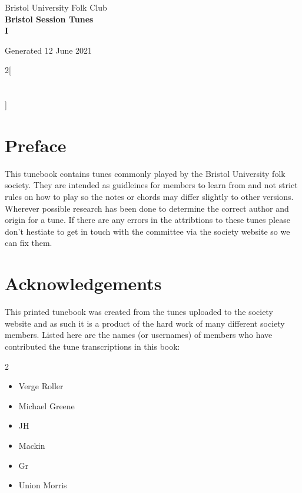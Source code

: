\documentclass[12pt,a4paper,twoside]{article}
\makeatletter
\newcommand{\thetitle}{Bristol Session Tunes \\ \vspace{0.65cm} I}
\newcommand{\thedate}{12 June 2021}
\renewcommand\tableofcontents{%
    \begin{multicols}{2}[
      \centering
      \section*{\large\contentsname
        \@mkboth{%
           \MakeUppercase\contentsname}{\MakeUppercase\contentsname}}]
    \@starttoc{toc}%
    \end{multicols}
}
\makeatother
\begin{document}
\begin{titlepage}
   \begin{center}
       \large Bristol University Folk Club \\

       \vspace{4cm}
       \textbf{\Huge \thetitle}

       \vspace{0.5cm}
       Generated \thedate

       \vspace{1.5cm}

       \vfill

   \end{center}
\end{titlepage}

\tableofcontents

\section{Preface}

This tunebook contains tunes commonly played by the Bristol University folk society. They are intended as guidleines for members to learn from and not strict rules on how to play so the notes or chords may differ slightly to other versions.
Wherever possible research has been done to determine the correct author and origin for a tune. If there are any errors in the attribtions to these tunes please don't hestiate to get in touch with the committee via the society website so we can fix them.

\section{Acknowledgements}

This printed tunebook was created from the tunes uploaded to the society website and as such it is a product of the hard work of many different society members. Listed here are the names (or usernames) of members who have contributed the tune transcriptions in this book:

\begin{multicols}{2}
\begin{itemize}\item Verge Roller
\item Michael Greene
\item JH
\item Mackin
\item Gr
\item Union Morris
\end{itemize}

\end{multicols}
\end{document}
